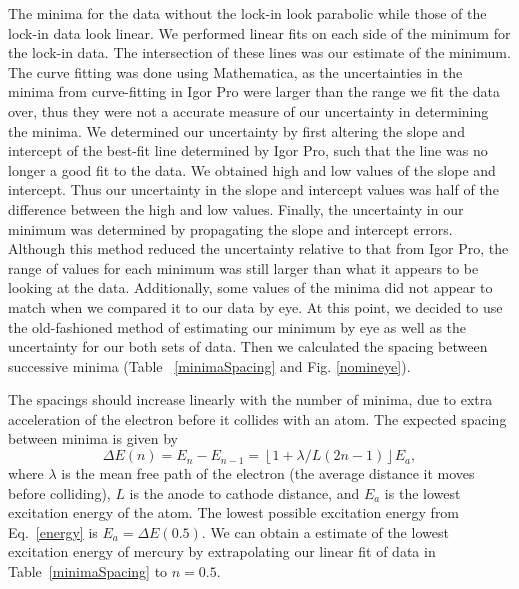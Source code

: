 \documentclass[prb,preprint]{revtex4-1}
\begin{document}
The minima for the data without the lock-in look parabolic while those of the lock-in data look linear.
We performed linear fits on each side of the minimum for the lock-in data. The intersection of these lines was our estimate of the minimum.
The curve fitting was done using Mathematica, as the uncertainties in the minima from curve-fitting in Igor Pro were larger than the range we fit the data over, thus they were not a accurate measure of our uncertainty in determining the minima.
We determined our uncertainty by first altering the slope and intercept of the best-fit line determined by Igor Pro, such that the line was no longer a good fit to the data. We obtained high and low values of the slope and intercept. 
Thus our uncertainty in the slope and intercept values was half of the difference between the high and low values.
Finally, the uncertainty in our minimum was determined by propagating the slope and intercept errors.
Although this method reduced the uncertainty relative to that from Igor Pro,  the range of values for each minimum was still larger than what it appears to be looking at the data. Additionally, some values of the minima did not appear to match when we compared it to our data by eye.
At this point, we decided to use the old-fashioned method of estimating our minimum by eye as well as the uncertainty for our both sets of data. Then we calculated the spacing between successive minima (Table ~\ref{minimaSpacing} and Fig. \ref{nomineye}). 

The spacings should increase linearly with the number of minima, due to extra acceleration of the electron before it collides with an atom. The expected spacing between minima is given by 
\begin{equation}\label{energy}\Delta E(n)=E_n-E_{n-1}=\left\lfloor 1+\lambda/L(2n-1)\right\rfloor E_a,\end{equation}
where $\lambda$ is the mean free path of the electron (the average distance it moves before colliding), $L$ is the anode to cathode distance, and $E_a$ is the lowest excitation energy of the atom. The lowest possible excitation energy from Eq.~\ref{energy} is $E_a=\Delta E(0.5)$. \cite{new}
We can obtain a estimate of the lowest excitation energy of mercury by extrapolating our linear fit of data in Table~\ref{minimaSpacing} to $n=0.5$. 
\end{document}
